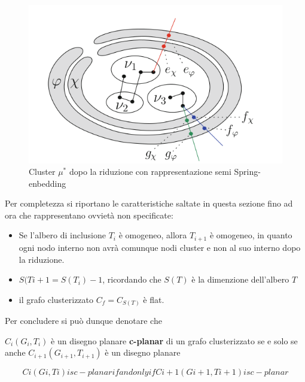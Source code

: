{\begin{figure}[!htb]
	\begin{center}
		\includegraphics[width=1.1 \linewidth]{figure/flatSpring}
	\end{center}
	\caption{Cluster $\mu^*$ dopo la riduzione con rappresentazione semi Spring-enbedding \label{fig:flatSpring}}
\end{figure}
Per completezza si riportano le caratteristiche saltate in questa sezione fino ad ora che rappresentano ovvietà non specificate:
\begin{itemize}
	\item Se l'albero di inclusione $T_i$ è omogeneo, allora $T_{i + 1}$ è omogeneo, in quanto ogni nodo interno non avrà comunque nodi cluster e non al suo interno dopo la riduzione.
	\item $S(T{i+1}= S(T_i)-1$, ricordando che $S(T)$ è la dimenzione dell'albero $T$
	\item il grafo clusterizzato $C_f = C_{S(T)}$ è flat.
\end{itemize} 
Per concludere si può dunque denotare che 
\begin{center}
	$C_i(G_i , T_i )$ è un disegno planare \textbf{c-planar} di un grafo clusterizzato se e solo se anche $C_{i+1}(G_{i+1} , T_{i+1} )$ è un disegno planare 
\end{center}
$$C i (G i , T i ) is c-planar if and only if C i+1 (G i+1 , T i+1 ) is c-planar$$
}
